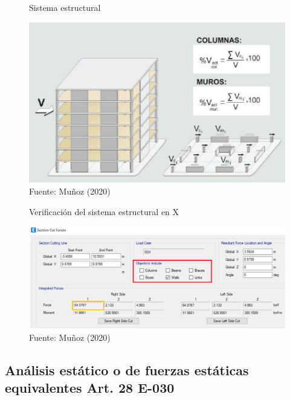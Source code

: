 \documentclass{article}%
\begin{document}
\begin{figure}[ht!]%
\centering%
\caption{Sistema estructural}%
\includegraphics[scale=0.7]{images/sist_estructural.PNG}%
\caption*{\small Fuente: Muñoz (2020)}%
\label{fig:sist_est}%
\end{figure}

%


\begin{figure}[ht!]%
\centering%
\caption{Verificación del sistema estructural en X}%
\includegraphics[scale=0.7]{images/sist_estructural_etabs.PNG}%
\caption*{\small Fuente: Muñoz (2020)}%
\label{fig:sist_est_etabs}%
\end{figure}

%
\subsection{Análisis estático o de fuerzas estáticas equivalentes Art. 28 E{-}030}%
\label{subsec:AnlisisestticoodefuerzasestticasequivalentesArt.28E{-}030}%

%
\end{document}
